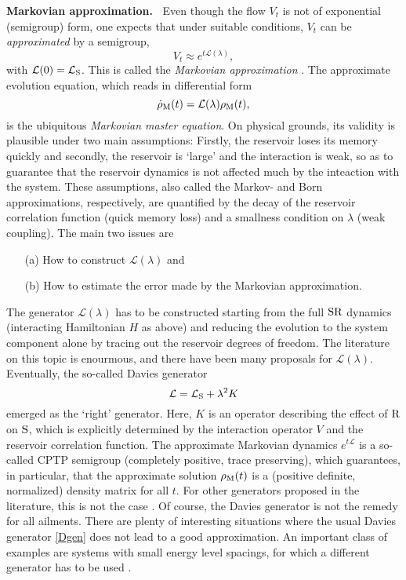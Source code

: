 \documentclass[letterpaper,onecolumn,11pt,accepted=2021-12-09]{quantumarticle}
\numberwithin{equation}{section}
\newcommand{\m}{{\rm M}}
\renewcommand{\r}{{\rm R}}
\newcommand{\s}{{\rm S}}
\begin{document}
{\bf Markovian approximation.\ } Even though the flow $V_t$ is not of exponential (semigroup) form, one expects that under suitable conditions, $V_t$ can be {\em approximated} by a semigroup,
$$
V_t\approx e^{t {\mathcal L}(\lambda)},
$$
with ${\mathcal L}(0)={\mathcal L}_\s$. This is called the {\em Markovian approximation} \cite{BP, RivasHuelga}. The approximate evolution equation, which reads in differential form
\begin{equation}
\label{i2}
\dot\rho_\m(t) = {\mathcal L}(\lambda)\rho_\m(t),
\end{equation}
is the ubiquitous {\em Markovian master equation}. On physical grounds, its validity is plausible under two main assumptions: Firstly, the reservoir loses its memory quickly and secondly, the reservoir is `large' and the interaction is weak, so as to guarantee that the reservoir dynamics is not affected much by the inteaction with the system. These assumptions, also called the Markov- and Born approximations, respectively, are quantified by the decay of the reservoir correlation function (quick memory loss) and a smallness condition on $\lambda$ (weak coupling). The main two issues are 
\begin{itemize}
	\item[(a)] How to construct ${\mathcal L}(\lambda)$ and 
	\item[(b)] How to estimate the error made by the Markovian approximation.
\end{itemize} 
The generator ${\mathcal L}(\lambda)$ has to be constructed starting from the full $\s\r$ dynamics (interacting Hamiltonian $H$ as above) and reducing the evolution to the system component alone by tracing out the reservoir degrees of freedom. The literature on this topic is enourmous, and there have been many proposals for ${\mathcal L}(\lambda)$. Eventually, the so-called Davies generator \cite{Da1,Da2} 
\begin{equation}
\label{Dgen}
{\mathcal L} = {\mathcal L}_\s+\lambda^2K
\end{equation}
emerged as the `right' generator. Here, $K$ is an operator describing the effect of $\r$ on $\s$, which is explicitly determined by the interaction operator $V$ and the reservoir correlation function. The approximate Markovian dynamics $e^{t {\mathcal L}}$ is a so-called CPTP semigroup \cite{AL,CP} (completely positive, trace preserving), which guarantees, in particular, that the approximate solution $\rho_\m(t)$ is a (positive definite, normalized) density matrix for all $t$. For other generators proposed in the literature, this is not the case \cite{DS}.  Of course, the Davies generator is not the remedy for all ailments. There are plenty of interesting situations where the usual Davies generator \eqref{Dgen} does not lead to a good approximation. An important class of examples are systems with small energy level spacings, for which a different generator has to be used \cite{ML,Majetal, Trush, NR,  Rivas,M3level,Mtransport}. 
\end{document}
